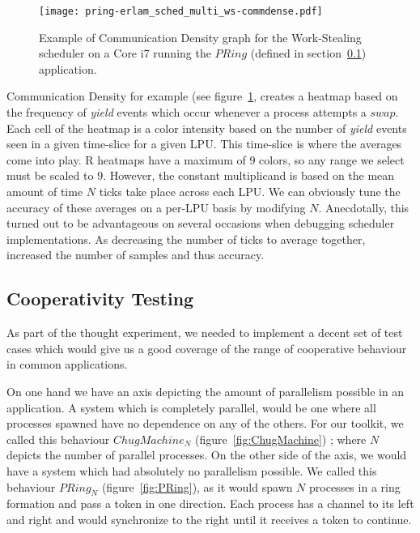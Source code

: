 \begin{figure}
\centering
\texttt{[image: pring-erlam\_sched\_multi\_ws-commdense.pdf]}
\caption{ Example of Communication Density graph for the Work-Stealing scheduler 
on a Core i7 running the $PRing$ (defined in section~\ref{sec:cooperativity testing})
application.}
\label{fig:commdense-example}
\end{figure}

Communication Density for example (see figure~\ref{fig:commdense-example}, 
creates a heatmap based on the frequency of
\emph{yield} events which occur whenever a process attempts a $swap$. Each cell
of the heatmap is a color intensity based on the number of \emph{yield} events 
seen in a given time-slice for a given LPU. This time-slice is where the averages
come into play. R heatmaps have a maximum of $9$ colors, so any range we 
select must be scaled to $9$. However, the constant multiplicand is based on the
mean amount of time $N$ ticks take place across each LPU.
We can obviously tune the accuracy of these averages on a per-LPU basis by
modifying $N$. Anecdotally, this turned out to be advantageous on several 
occasions when debugging scheduler implementations. As decreasing the number of
ticks to average together, increased the number of samples and thus accuracy.

\subsection{Cooperativity Testing}\label{sec:cooperativity testing}

As part of the thought experiment, we needed to implement a decent set of test 
cases which would give us a good coverage of the range of cooperative behaviour
in common applications. 

On one hand we have an axis depicting the amount of parallelism possible in an 
application. A system which is completely parallel, would be one where all 
processes spawned have no dependence on any of the others. For our toolkit, we 
called this behaviour $ChugMachine_N$ (figure~\ref{fig:ChugMachine}) ; where $N$ depicts the number of parallel 
processes. On the other side of the axis, we would have a system which had 
absolutely no parallelism possible. We called this behaviour $PRing_N$ (figure~\ref{fig:PRing}), as it
would spawn $N$ processes in a ring formation and pass a token in one direction.
Each process has a channel to its left and right and would synchronize to the 
right until it receives a token to continue. 

